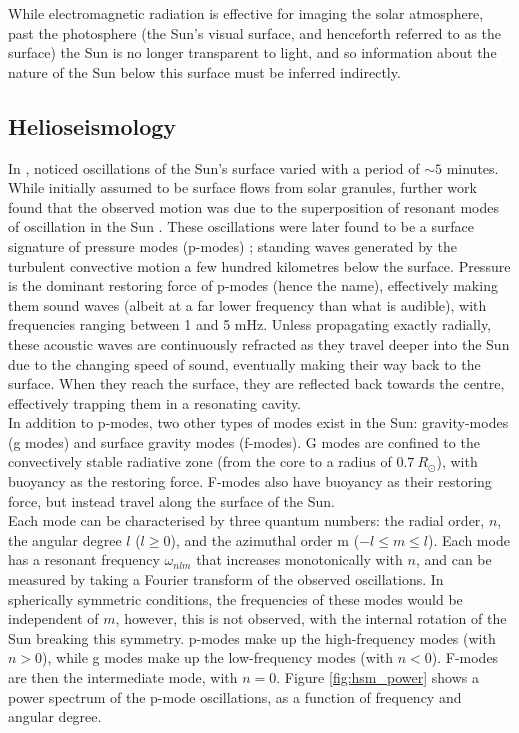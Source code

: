 \documentclass[11pt,a4paper,onecolumn]{report}
\begin{document}
While electromagnetic radiation is effective for imaging the solar atmosphere,
past the photosphere (the Sun's visual surface, and henceforth referred to as
the surface) the Sun is no longer transparent to light, and so information about
the nature of the Sun below this surface must be inferred indirectly. \\


%
\subsection{Helioseismology}
%
\label{sec:HSM}

In \citeyear{leighton_velocity_1962}, \citeauthor{leighton_velocity_1962}
noticed oscillations of the Sun's surface varied with a period of \(\sim
5\) minutes. While initially assumed to be surface flows from solar granules,
further work found that the observed motion was due to the superposition of
resonant modes of oscillation in the Sun \citep{ulrich_five-minute_1970}. These
oscillations were later found to be a surface signature of pressure modes
(p-modes) \citep{deubner_observations_1975}; standing waves generated by the
turbulent convective motion a few hundred kilometres below the surface. Pressure
is the dominant restoring force of p-modes (hence the name), effectively making
them sound waves (albeit at a far lower frequency than what is audible), with
frequencies ranging between 1 and 5 mHz. Unless propagating exactly radially,
these acoustic waves are continuously refracted as they travel deeper into the
Sun due to the changing speed of sound, eventually making their way back to the
surface. When they reach the surface, they are reflected back towards the
centre, effectively trapping them in a resonating cavity. \\

In addition to p-modes, two other types of modes exist in the Sun: gravity-modes
(g modes) and surface gravity modes (f-modes). G modes are confined to the
convectively stable radiative zone (from the core to a radius of $\SI{0.7}
{R_\odot}$), with buoyancy as the restoring force. F-modes also have buoyancy as
their restoring force, but instead travel along the surface of the Sun. \\

Each mode can be characterised by three quantum numbers: the radial order,
\(n\), the angular degree \(l\) (\(l \geq 0\)), and the azimuthal order m (\(-l
\leq m \leq l\)). Each mode has a resonant frequency \(\omega_{nlm}\) that
increases monotonically with \(n\), and can be measured by taking a Fourier
transform of the observed oscillations. In spherically symmetric conditions, the
frequencies of these modes would be independent of \(m\), however, this is not
observed, with the internal rotation of the Sun breaking this symmetry. p-modes
make up the high-frequency modes (with \(n>0\)), while g modes make up the
low-frequency modes (with \(n<0\)). F-modes are then the intermediate mode, with
\(n=0\). Figure \ref{fig:hsm_power} shows a power spectrum of the p-mode
oscillations, as a function of frequency and angular degree. \\
\end{document}
